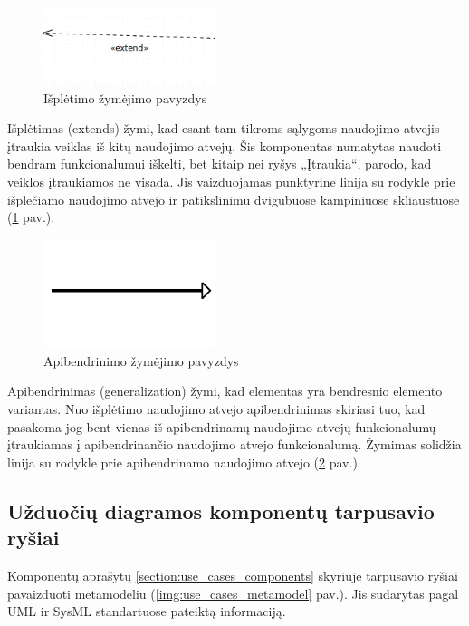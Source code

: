 \documentclass{VUMIFInfBakalaurinis}
\begin{document}
\begin{figure}[H]
	\centering
	\includegraphics[width=5cm]{img/use_case_components/extend}
	\caption{Išplėtimo žymėjimo pavyzdys}
	\label{img:use_case_components_extends}
\end{figure}

Išplėtimas (extends) žymi, kad esant tam tikroms sąlygoms naudojimo atvejis įtraukia veiklas iš kitų naudojimo atvejų. Šis komponentas numatytas naudoti bendram funkcionalumui iškelti, bet kitaip nei ryšys „Įtraukia“, parodo, kad veiklos įtraukiamos ne visada. Jis vaizduojamas punktyrine linija su rodykle prie išplečiamo naudojimo atvejo ir patikslinimu dvigubuose kampiniuose skliaustuose (\ref{img:use_case_components_extends} pav.).

\begin{figure}[H]
	\centering
	\includegraphics[width=5cm]{img/use_case_components/generalization}
	\caption{Apibendrinimo žymėjimo pavyzdys}
	\label{img:use_case_components_generalization}
\end{figure}

Apibendrinimas (generalization) žymi, kad elementas yra bendresnio elemento variantas. Nuo išplėtimo naudojimo atvejo apibendrinimas skiriasi tuo, kad pasakoma jog bent vienas iš apibendrinamų naudojimo atvejų funkcionalumų įtraukiamas į apibendrinančio naudojimo atvejo funkcionalumą. Žymimas solidžia linija su rodykle prie apibendrinamo naudojimo atvejo (\ref{img:use_case_components_generalization} pav.).

\subsection{ Užduočių diagramos komponentų tarpusavio ryšiai}

Komponentų aprašytų \ref{section:use_cases_components} skyriuje tarpusavio ryšiai  pavaizduoti metamodeliu (\ref{img:use_cases_metamodel} pav.). Jis sudarytas pagal UML ir SysML standartuose pateiktą informaciją. 
\end{document}
